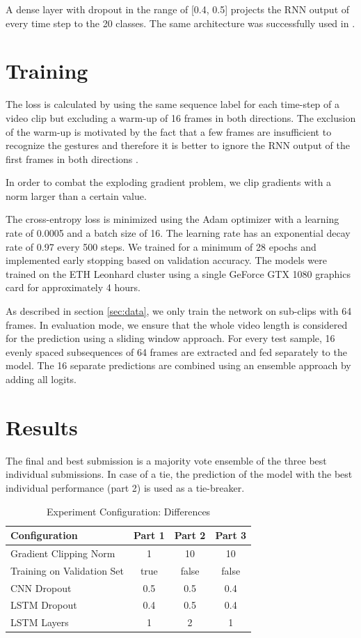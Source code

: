 A dense layer with dropout in the range of [0.4, 0.5] projects the RNN output of every time step to the 20 classes.  The same architecture was successfully used in \cite{Pigou16}.


\section{Training}

The loss is calculated by using the same sequence label for each time-step of a video clip but excluding a warm-up of 16 frames in both directions. The exclusion of the warm-up is motivated by the fact that a few frames are insufficient to recognize the gestures and therefore it is better to ignore the RNN output of the first frames in both directions \cite{Pigou16}. 

In order to combat the exploding gradient problem, we clip gradients with a norm larger than a certain value.

The cross-entropy loss is minimized using the Adam optimizer with a learning rate of 0.0005 and a batch size of 16. The learning rate has an exponential decay rate of 0.97 every 500 steps. We trained for a minimum of 28 epochs and implemented early stopping based on validation accuracy.
The models were trained on the ETH Leonhard cluster using a single GeForce GTX 1080 graphics card for approximately 4 hours.

As described in section \ref{sec:data}, we only train the network on sub-clips with 64 frames.
In evaluation mode, we ensure that the whole video length is considered for the prediction using a sliding window approach. For every test sample, 16 evenly spaced subsequences of 64 frames are extracted and fed separately to the model. The 16 separate predictions are combined using an ensemble approach by adding all logits. 


\section{Results}

The final and best submission is a majority vote ensemble of the three best individual submissions. In case of a tie, the prediction of the model with the best individual performance (part 2) is used as a tie-breaker. 

\begin{table}[h!]
  \caption{Experiment Configuration: Differences}
  \label{tab:exp-diff}
  \begin{tabular}{lccc}
    \toprule
    Configuration & Part 1 & Part 2 & Part 3 \\
    \midrule
    Gradient Clipping Norm & 1 & 10 & 10 \\
    Training on Validation Set & true & false & false \\
    CNN Dropout & 0.5 & 0.5 & 0.4 \\
    LSTM Dropout & 0.4 & 0.5 & 0.4 \\
    LSTM Layers & 1 & 2 & 1 \\
  \bottomrule
\end{tabular}
\end{table}

